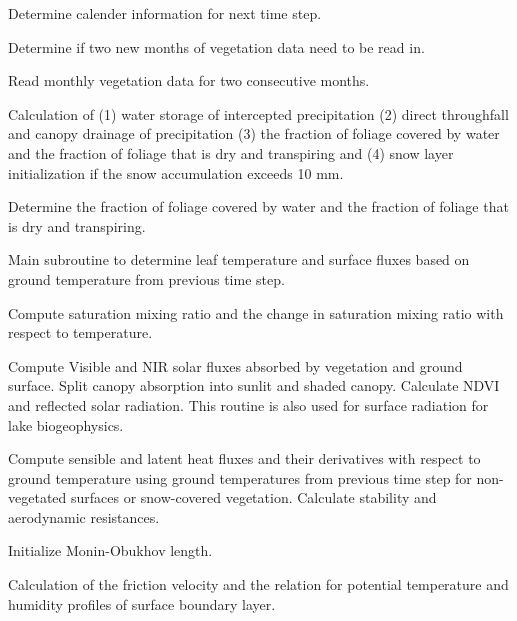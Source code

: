 \documentclass[]{article}
\begin{document}
Determine calender information for next time step. \newline

Determine if two new months of vegetation data need to be read in. \newline

Read monthly vegetation data for two consecutive months. \newline

Calculation of (1) water storage of intercepted precipitation (2)
direct throughfall and canopy drainage of precipitation (3) the
fraction of foliage covered by water and the fraction of foliage that
is dry and transpiring and (4) snow layer initialization if the snow
accumulation exceeds 10 mm. \newline

Determine the fraction of foliage covered by water and the fraction of
foliage that is dry and transpiring. \newline

Main subroutine to determine leaf temperature and surface fluxes based
on ground temperature from previous time step. \newline

Compute saturation mixing ratio and the change in saturation mixing
ratio with respect to temperature. \newline

Compute Visible and NIR solar fluxes absorbed by vegetation and ground
surface. Split canopy absorption into sunlit and shaded
canopy. Calculate NDVI and reflected solar radiation. This routine is
also used for surface radiation for lake biogeophysics. \newline

Compute sensible and latent heat fluxes and their derivatives with
respect to ground temperature using ground temperatures from
previous time step for non-vegetated surfaces or snow-covered
vegetation. Calculate stability and aerodynamic resistances. \newline

Initialize Monin-Obukhov length. \newline

Calculation of the friction velocity and the relation for potential
temperature and humidity profiles of surface boundary layer. \newline
\end{document}
